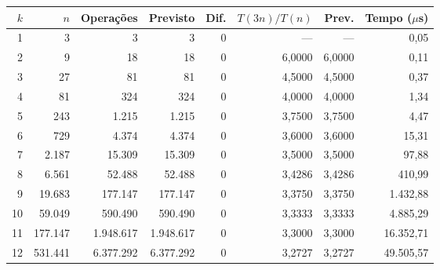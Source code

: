 \begin{tabular}{rrrrrrrr}
\toprule
$k$ & $n$ & Operações & Previsto & Dif. & $T(3n)/T(n)$ & Prev. & Tempo ($\mu$s) \\
\midrule
1 & 3 & 3 & 3 & 0 & --- & --- & 0,05 \\
2 & 9 & 18 & 18 & 0 & 6,0000 & 6,0000 & 0,11 \\
3 & 27 & 81 & 81 & 0 & 4,5000 & 4,5000 & 0,37 \\
4 & 81 & 324 & 324 & 0 & 4,0000 & 4,0000 & 1,34 \\
5 & 243 & 1.215 & 1.215 & 0 & 3,7500 & 3,7500 & 4,47 \\
6 & 729 & 4.374 & 4.374 & 0 & 3,6000 & 3,6000 & 15,31 \\
7 & 2.187 & 15.309 & 15.309 & 0 & 3,5000 & 3,5000 & 97,88 \\
8 & 6.561 & 52.488 & 52.488 & 0 & 3,4286 & 3,4286 & 410,99 \\
9 & 19.683 & 177.147 & 177.147 & 0 & 3,3750 & 3,3750 & 1.432,88 \\
10 & 59.049 & 590.490 & 590.490 & 0 & 3,3333 & 3,3333 & 4.885,29 \\
11 & 177.147 & 1.948.617 & 1.948.617 & 0 & 3,3000 & 3,3000 & 16.352,71 \\
12 & 531.441 & 6.377.292 & 6.377.292 & 0 & 3,2727 & 3,2727 & 49.505,57 \\
\bottomrule
\end{tabular}
